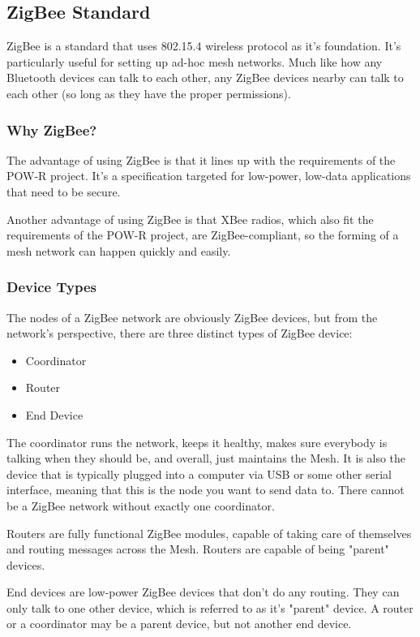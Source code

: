 
\subsection{ZigBee Standard}
ZigBee is a standard that uses 802.15.4 wireless protocol as it's foundation. It's 
particularly useful for setting up ad-hoc mesh networks. Much like how any Bluetooth
devices can talk to each other, any ZigBee devices nearby can talk to each other (so 
long as they have the proper permissions).

\subsubsection{Why ZigBee?}
The advantage of using ZigBee is that it lines up with the requirements of the POW-R
project. It's a specification targeted for low-power, low-data applications that need
to be secure. 

Another advantage of using ZigBee is that XBee radios, which also fit the requirements
of the POW-R project, are ZigBee-compliant, so the forming of a mesh network can happen
quickly and easily.

\subsubsection{Device Types}
The nodes of a ZigBee network are obviously ZigBee devices, but from the network's
perspective, there are three distinct types of ZigBee device:

\begin{itemize}
	\item Coordinator
	\item Router
	\item End Device
\end{itemize}

The coordinator runs the network, keeps it healthy, makes sure everybody is talking when
they should be, and overall, just maintains the Mesh. It is also the device that is 
typically plugged into a computer via USB or some other serial interface, meaning
that this is the node you want to send data to. There cannot be a ZigBee network
without exactly one coordinator.

Routers are fully functional ZigBee modules, capable of taking care of themselves and
routing messages across the Mesh. Routers are capable of being "parent" devices.

End devices are low-power ZigBee devices that don't do any routing. They can only talk
to one other device, which is referred to as it's "parent" device. A router or a coordinator
may be a parent device, but not another end device.

